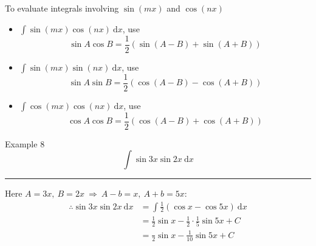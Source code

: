 \documentclass[12pt,a4paper]{article}
\def\d{{\mathrm{d}}}
\begin{document}
\begin{thm}{To evaluate integrals involving $\sin{(mx)}$ and $\cos{(nx)}$}
	\begin{itemize}
		\item $\displaystyle\int\sin{(mx)}\cos{(nx)}\ \d x$, use $$\sin{A}\cos{B}=\frac{1}{2}\left(\sin{(A-B)}+\sin{(A+B)}\right)$$
		\item $\displaystyle\int\sin{(mx)}\sin{(nx)}\ \d x$, use $$\sin{A}\sin{B}=\frac{1}{2}\left(\cos{(A-B)}-\cos{(A+B)}\right)$$
		\item $\displaystyle\int\cos{(mx)}\cos{(nx)}\ \d x$, use $$\cos{A}\cos{B}=\frac{1}{2}\left(\cos{(A-B)}+\cos{(A+B)}\right)$$
	\end{itemize}
\end{thm}
\begin{eg}{Example 8}
	$$\int\sin{3x}\sin{2x}\ \d x$$
	\noindent\rule[0.25\baselineskip]{\textwidth}{1pt}
	Here $A=3x,\ B=2x\ \Rightarrow\ A-b=x,\ A+b=5x$: 
	$$\begin{aligned}
		\therefore \sin{3x}\sin{2x}\ \d x&=\int\frac{1}{2}\left(\cos{x}-\cos{5x}\right)\ \d x\\
		&=\frac{1}{2}\sin{x}-\frac{1}{2}\cdot\frac{1}{5}\sin{5x}+C\\
		&=\frac{}{2}\sin{x}-\frac{1}{10}\sin{5x}+C
	\end{aligned}$$
\end{eg}
\end{document}

